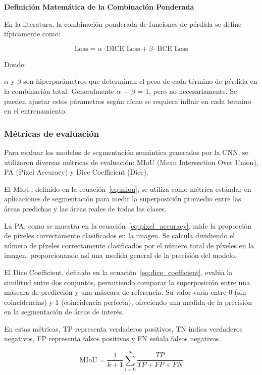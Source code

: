 \textbf{Definición Matemática de la Combinación Ponderada}

En la literatura, la combinación ponderada de funciones de pérdida se define típicamente como:

\begin{equation}
	\text{Loss} = \alpha \cdot \text{DICE Loss} + \beta \cdot \text{BCE Loss}
\end{equation}

Donde:

$\alpha$ y $\beta $ son hiperparámetros que determinan el peso de cada término de pérdida en la combinación total.
Generalmente $\alpha$ + $\beta $ = 1, pero no necesariamente. Se pueden ajustar estos párametros según cómo se requiera influir en cada termino en el entrenamiento. 

\subsubsection{Métricas de evaluación}


Para evaluar los modelos de segmentación semántica generados por la CNN, se utilizaron diversas métricas de evaluación: MIoU (Mean Intersection Over Union), PA (Pixel Accuracy) y Dice Coefficient (Dice).

El MIoU, definido en la ecuación~\ref{eq:miou}, se utiliza como métrica estándar en aplicaciones de segmentación para medir la superposición promedio entre las áreas predichas y las áreas reales de todas las clases.

La PA, como se muestra en la ecuación~\ref{eq:pixel_accuracy}, mide la proporción de píxeles correctamente clasificados en la imagen. Se calcula dividiendo el número de píxeles correctamente clasificados por el número total de píxeles en la imagen, proporcionando así una medida general de la precisión del modelo.

El Dice Coefficient, definido en la ecuación~\ref{eq:dice_coefficient}, evalúa la similitud entre dos conjuntos, permitiendo comparar la superposición entre una máscara de predicción y una máscara de referencia. Su valor varía entre 0 (sin coincidencias) y 1 (coincidencia perfecta), ofreciendo una medida de la precisión en la segmentación de áreas de interés.

En estas métricas, TP representa verdaderos positivos, TN indica verdaderos negativos, FP representa falsos positivos y FN señala falsos negativos.

\begin{equation}
	\label{eq:miou}
	\text{MIoU} = \frac{1}{k+1} \sum_{i=0}^{N} \frac{TP}{TP+FP+FN}
\end{equation}

